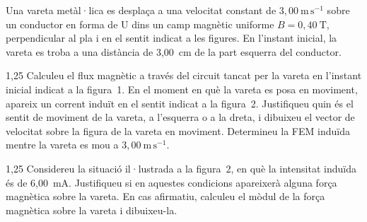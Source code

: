 Una vareta metàl·lica es desplaça a una velocitat constant de $3,00\ \mathrm{m\,s^{-1}}$ sobre un conductor en forma de U dins un camp magnètic uniforme $B = 0,40\ \mathrm{T}$, perpendicular al pla i en el sentit indicat a les figures. En l'instant inicial, la vareta es troba a una distància de 3,00~cm de la part esquerra del conductor.

\begin{apartat}{1,25}
Calculeu el flux magnètic a través del circuit tancat per la vareta en l'instant inicial indicat a la figura~1. En el moment en què la vareta es posa en moviment, apareix un corrent induït en el sentit indicat a la figura~2. Justifiqueu quin és el sentit de moviment de la vareta, a l'esquerra o a la dreta, i dibuixeu el vector de velocitat sobre la figura de la vareta en moviment. Determineu la FEM induïda mentre la vareta es mou a $3,00\ \mathrm{m\,s^{-1}}$.
\end{apartat}


\begin{apartat}{1,25}
Considereu la situació il·lustrada a la figura~2, en què la intensitat induïda és de 6,00~mA. Justifiqueu si en aquestes condicions apareixerà alguna força magnètica sobre la vareta. En cas afirmatiu, calculeu el mòdul de la força magnètica sobre la vareta i dibuixeu-la.
\end{apartat}
